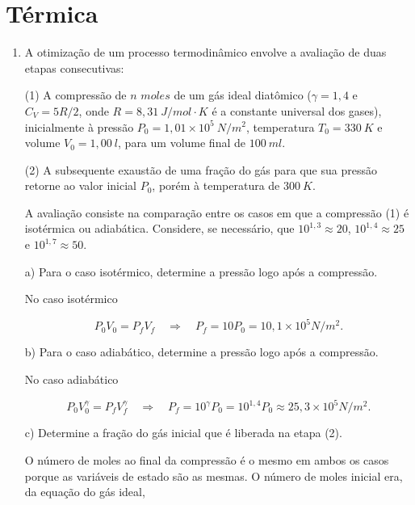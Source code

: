 %
%
\chapter{Térmica}


\begin{enumerate}[start=1,label={\bfseries Q\arabic*.}]


\item A otimização de um processo termodinâmico envolve a avaliação de duas etapas consecutivas:


\item[(1)] A compressão de $n$ $moles$ de um gás ideal diatômico ($\gamma = 1,4$ e $C_{V} = 5R/2$, onde $R = 8,31 \ J/mol \cdot K$ é a constante universal dos gases), inicialmente à pressão $P_{0} = 1,01 \times 10^{5} \ N/m^{2}$, temperatura $T_{0} = 330 \ K$ e volume $V_{0} = 1,00 \ l$, para um volume final de $100 \ ml$.

\item[(2)] A subsequente exaustão de uma fração do gás para que sua pressão retorne ao valor inicial $P_{0}$, porém à temperatura de $300 \ K$.

    A avaliação consiste na comparação entre os casos em que a compressão (1) é isotérmica ou adiabática. Considere, se necessário, que $10^{1,3} \approx 20$, $10^{1,4} \approx 25$ e $10^{1,7} \approx 50$.

a) Para o caso isotérmico, determine a pressão logo após a compressão.

{\color{red}

No caso isotérmico

$$
P_{0} V_{0} = P_{f} V_{f} \quad \Rightarrow \quad P_{f} = 10 P_{0} = 10,1 \times 10^{5} N/m^{2}.
$$

}

b) Para o caso adiabático, determine a pressão logo após a compressão.

{\color{red}

No caso adiabático

$$
P_{0} V_{0}^{\gamma} = P_{f} V_{f}^{\gamma} \quad \Rightarrow \quad P_{f} = 10^{\gamma} P_{0} = 10^{1,4} P_{0} \approx 25,3 \times 10^{5} N/m^{2}.
$$

}

c) Determine a fração do gás inicial que é liberada na etapa (2).
{\color{red}

O número de moles ao final da compressão é o mesmo em ambos os casos porque as variáveis de estado são as mesmas. O número de moles inicial era, da equação do gás ideal,

}
\end{enumerate}
